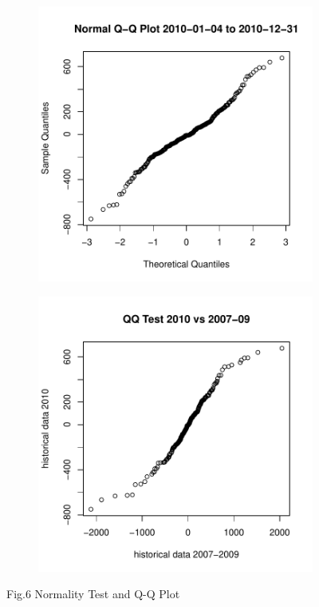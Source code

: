 \documentclass[11pt]{article}
\begin{document}
\begin{figure}[h]
\begin{subfigure}{0.33\textwidth}
  \includegraphics[width=1\linewidth]{graph/NormalQQPlot2010sq.pdf}
\end{subfigure}
\begin{subfigure}{0.33\textwidth}
  \centering
  \includegraphics[width=1\linewidth]{graph/QQ200709against2010sq.pdf}
\end{subfigure}
\centering Fig.6 Normality Test and Q-Q Plot
\end{figure}
\end{document}
